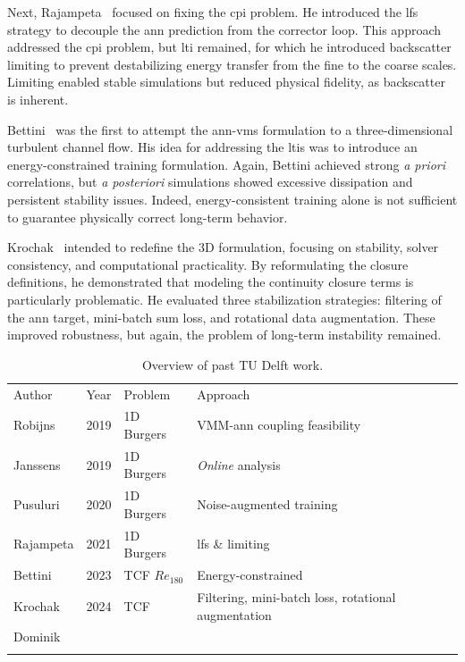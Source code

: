 Next, Rajampeta~\cite{Rajampeta2021} focused on fixing the \gls{cpi} problem.
He introduced the \gls{lfs} strategy to decouple the \gls{ann} prediction from the corrector loop.
This approach addressed the \gls{cpi} problem, but \gls{lti} remained, for which he introduced backscatter limiting to prevent destabilizing energy transfer from the fine to the coarse scales.
Limiting enabled stable simulations but reduced physical fidelity, as backscatter is inherent.

Bettini~\cite{Bettini2023} was the first to attempt the \gls{ann}-\gls{vms} formulation to a three-dimensional turbulent channel flow.
His idea for addressing the \gls{lti}s was to introduce an energy-constrained training formulation.
Again, Bettini achieved strong \emph{a priori} correlations, but \emph{a posteriori} simulations showed excessive dissipation and persistent stability issues.
Indeed, energy-consistent training alone is not sufficient to guarantee physically correct long-term behavior.

Krochak~\cite{Krochak2024} intended to redefine the 3D formulation, focusing on stability, solver consistency, and computational practicality.
By reformulating the closure definitions, he demonstrated that modeling the continuity closure terms is particularly problematic.
He evaluated three stabilization strategies: filtering of the \gls{ann} target, mini-batch sum loss, and rotational data augmentation.
These improved robustness, but again, the problem of long-term instability remained.


\begin{table}[h]
    \centering
    \caption{Overview of past TU Delft work.}
    \label{tab:past_overview}
    \begin{tabular}{H l l l}
        \bluetoprule
        Author & Year & Problem & Approach \\
        \blueheadrule
        Robijns   & 2019 & 1D Burgers & VMM-\gls{ann} coupling feasibility                  \\
        Janssens  & 2019 & 1D Burgers & \emph{Online} analysis \\
        Pusuluri  & 2020 & 1D Burgers & Noise-augmented training \\
        Rajampeta & 2021 & 1D Burgers & \gls{lfs} \& limiting \\
        Bettini   & 2023 & TCF $Re_{180}$ & Energy-constrained \\
        Krochak   & 2024 & TCF & Filtering, mini-batch loss, rotational augmentation \\
        Dominik & & &  \\
        \bluebottomrule
    \end{tabular}
\end{table}
